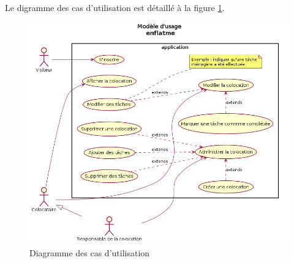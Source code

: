 Le digramme des cas d'utilisation est détaillé à la figure \ref{fig:diagCasUtil}.
\begin{center}
	\begin{figure}[H]
		\includegraphics[scale=0.6]{../casUtilisation/casUtilisation.png}
		\caption{\label{fig:diagCasUtil}Diagramme des cas d'utilisation}
	\end{figure}
\end{center}